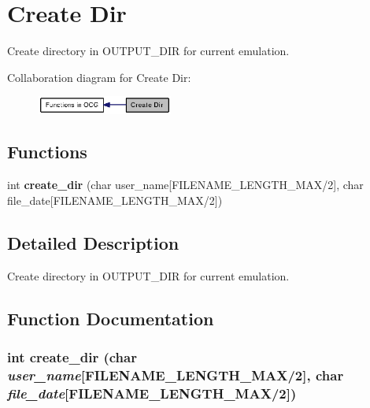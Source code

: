 \section{Create Dir}
\label{group____create__dir}
Create directory in OUTPUT\_\-DIR for current emulation.  




Collaboration diagram for Create Dir:\nopagebreak
\begin{figure}[H]
\begin{center}
\leavevmode
\includegraphics[width=126pt]{group____create__dir}
\end{center}
\end{figure}
\subsection*{Functions}
\begin{CompactItemize}
\item 
int {\bf create\_\-dir} (char user\_\-name[FILENAME\_\-LENGTH\_\-MAX/2], char file\_\-date[FILENAME\_\-LENGTH\_\-MAX/2])
\end{CompactItemize}


\subsection{Detailed Description}
Create directory in OUTPUT\_\-DIR for current emulation. 

\subsection{Function Documentation}
\subsubsection[{create\_\-dir}]{\setlength{\rightskip}{0pt plus 5cm}int create\_\-dir (char {\em user\_\-name}[FILENAME\_\-LENGTH\_\-MAX/2], \/  char {\em file\_\-date}[FILENAME\_\-LENGTH\_\-MAX/2])}\label{group____create__dir_g1146e990e256636ef351e2151f845048}


